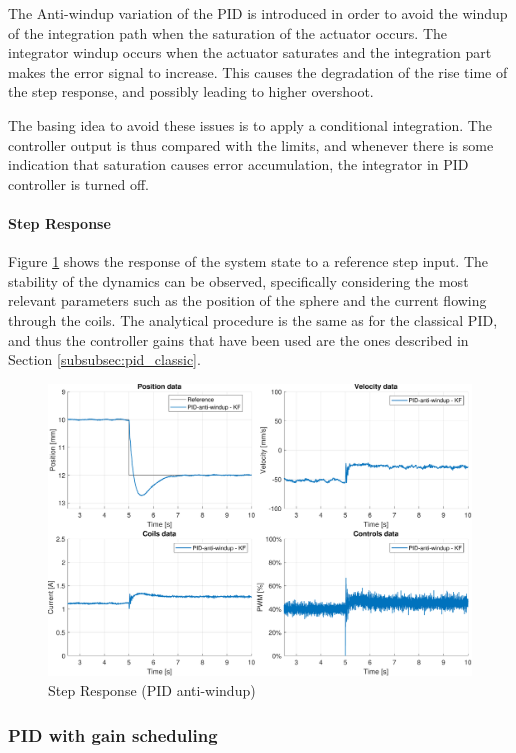 The Anti-windup variation of the PID is introduced in order to avoid the windup of the integration path when the saturation of the actuator occurs.
The integrator windup occurs when the actuator saturates and the integration part makes the error signal to increase.
This causes the degradation of the rise time of the step response, and possibly leading to higher overshoot.

The basing idea to avoid these issues is to apply a conditional integration.
The controller output is thus compared with the limits, and whenever there is some indication that saturation causes error accumulation, the integrator in PID controller is turned off.

\paragraph{Step Response}

Figure \ref{fig:pid_anti_windup_step_response} shows the response of the system state to a reference step input.
The stability of the dynamics can be observed, specifically considering the most relevant parameters such as the position of the sphere and the current flowing through the coils.
The analytical procedure is the same as for the classical PID, and thus the controller gains that have been used are the ones described in Section \ref{subsubsec:pid_classic}.

\begin{figure}[H]
    \centering
    \includegraphics[width=0.8\linewidth]{./img/MATLAB/results/step_PID_anti_windup_star.pdf}
    \caption{Step Response (PID anti-windup)}
    \label{fig:pid_anti_windup_step_response}
\end{figure}



\subsubsection{PID with gain scheduling}
\label{subsubsec:pid_gain_scheduling}

